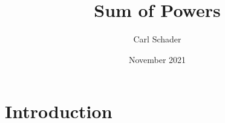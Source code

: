 \documentclass{article}
\title{Sum of Powers}
\author{Carl Schader}
\date{November 2021}
\begin{document}
\maketitle

\section{Introduction}
\end{document}
